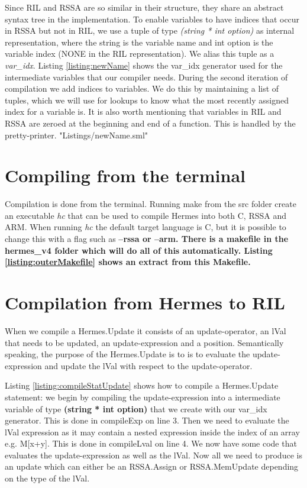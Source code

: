 Since RIL and RSSA are so similar in their structure, they share an abstract syntax tree in the implementation.
To enable variables to have indices that occur in RSSA but not in RIL, we use a tuple of type \emph{(string * int option)} as internal representation, where the string is the variable name and int option is the variable index (NONE in the RIL representation).
We alias this tuple as a \emph{var\_idx}. Listing \ref{listing:newName} shows the var\_idx generator used for the intermediate variables that our compiler needs.
During the second iteration of compilation we add indices to variables. We do this by maintaining a list of tuples, which we will use for lookups to know what the most recently assigned index for a variable is.
It is also worth mentioning that variables in RIL and RSSA are zeroed at the beginning and end of a function. This is handled by the pretty-printer.
 {"Listings/newName.sml"}

\section{Compiling from the terminal}
Compilation is done from the terminal. Running make from the src folder create an executable \emph{hc} that can be used to compile Hermes into both C, RSSA and ARM.
When running \emph{hc} the default target language is C, but it is possible to change this with a flag such as \bf{--rssa} or \bf{--arm}.
There is a makefile in the hermes\_v4 folder which will do all of this automatically. Listing \ref{listing:outerMakefile} shows an extract from this Makefile.


\section{Compilation from Hermes to RIL}
When we compile a Hermes.Update it consists of an update-operator, an lVal that needs to be updated, an update-expression and a position. Semantically speaking, the purpose of the Hermes.Update is to is to evaluate the update-expression and update the lVal with respect to the update-operator.

Listing \ref{listing:compileStatUpdate} shows how to compile a Hermes.Update statement: we begin by compiling the update-expression into a intermediate variable of type \textbf{(string * int option)} that we create with our var\_idx generator. This is done in compileExp on line 3. Then we need to evaluate the lVal expression as it may contain a nested expression inside the index of an array e.g. M[x+y]. This is done in compileLval on line 4.
We now have some code that evaluates the update-expression as well as the lVal. Now all we need to produce is an update which can either be an RSSA.Assign or RSSA.MemUpdate depending on the type of the lVal.

